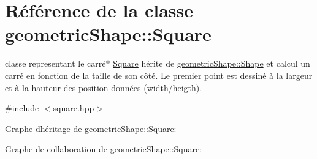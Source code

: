 \hypertarget{classgeometric_shape_1_1_square}{}\section{Référence de la classe geometric\+Shape\+:\+:Square}
\label{classgeometric_shape_1_1_square}


classe representant le carré$\ast$ \hyperlink{classgeometric_shape_1_1_square}{Square} hérite de \hyperlink{classgeometric_shape_1_1_shape}{geometric\+Shape\+::\+Shape} et calcul un carré en fonction de la taille de son côté. Le premier point est dessiné à la largeur et à la hauteur des position données (width/heigth). 




{\ttfamily \#include $<$square.\+hpp$>$}



Graphe d\textquotesingle{}héritage de geometric\+Shape\+:\+:Square\+:


Graphe de collaboration de geometric\+Shape\+:\+:Square\+:
